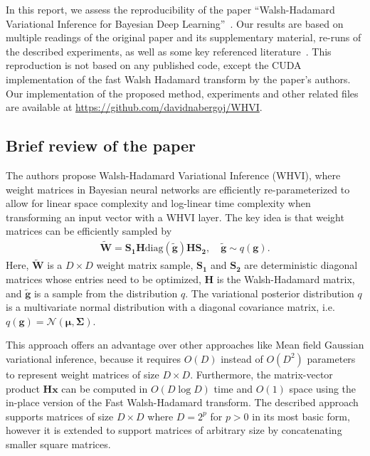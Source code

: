 In this report, we assess the reproducibility of the paper ``Walsh-Hadamard Variational Inference for Bayesian Deep Learning''~\cite{rossi2019walsh}.
Our results are based on multiple readings of the original paper and its supplementary material, re-runs of the described experiments, as well as some key referenced literature~\cite{le2014fastfood, blundell2015weight, fino1976unified, kingma2015variational, rossi2019good}.
This reproduction is not based on any published code, except the CUDA implementation of the fast Walsh Hadamard transform by the paper's authors.
Our implementation of the proposed method, experiments and other related files are available at \url{https://github.com/davidnabergoj/WHVI}.

\subsection{Brief review of the paper}\label{subsec:brief-review-of-the-paper}
The authors propose Walsh-Hadamard Variational Inference (WHVI), where weight matrices in Bayesian neural networks are efficiently re-parameterized to allow for linear space complexity and log-linear time complexity when transforming an input vector with a WHVI layer.
The key idea is that weight matrices can be efficiently sampled by
\begin{align}
    \widetilde{\mathbf{W}} = \mathbf{S_1} \mathbf{H} \mathrm{diag}(\widetilde{\mathbf{g}}) \mathbf{H} \mathbf{S_2},\quad\widetilde{\mathbf{g}} \sim q(\mathbf{g}).
    \label{eqn:weight-sampling}
\end{align}
Here, $\widetilde{\mathbf{W}}$ is a $D \times D$ weight matrix sample, $\mathbf{S_1}$ and $\mathbf{S_2}$ are deterministic diagonal matrices whose entries need to be optimized, $\mathbf{H}$ is the Walsh-Hadamard matrix, and $\widetilde{\mathbf{g}}$ is a sample from the distribution $q$.
The variational posterior distribution $q$ is a multivariate normal distribution with a diagonal covariance matrix, i.e.\ $q(\mathbf{g}) = \mathcal{N}(\mathbf{\mu}, \mathbf{\Sigma})$.

This approach offers an advantage over other approaches like Mean field Gaussian variational inference, because it requires $O(D)$ instead of $O(D^2)$ parameters to represent weight matrices of size $D \times D$.
Furthermore, the matrix-vector product $\mathbf{Hx}$ can be computed in $O(D \log D)$ time and $O(1)$ space using the in-place version of the Fast Walsh-Hadamard transform.
The described approach supports matrices of size $D \times D$ where $D = 2^p$ for $p > 0$ in its most basic form, however it is extended to support matrices of arbitrary size by concatenating smaller square matrices.

